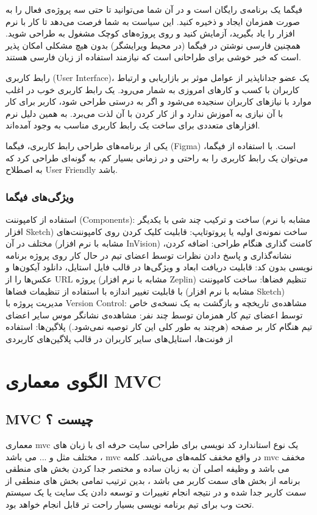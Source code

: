 فیگما یک برنامه‌ی رایگان است و در آن شما می‌توانید تا حتی سه پروژه‌ی فعال را به صورت همزمان ایجاد و ذخیره کنید. این سیاست به شما فرصت می‌دهد تا کار با نرم افزار را یاد بگیرید، آزمایش کنید و روی پروژه‌های کوچک مشغول به طراحی شوید. همچنین فارسی نوشتن در فیگما (در محیط ویرایشگر) بدون هیچ مشکلی امکان پذیر است که خبر خوشی برای طراحانی است که نیازمند استفاده از زبان فارسی هستند.

رابط کاربری (User Interface)، یک عضو جداناپذیر از عوامل موثر بر بازاریابی و ارتباط کاربران با کسب و کارهای امروزی به شمار می‌رود. یک رابط کاربری خوب در اغلب موارد با نیازهای کاربران سنجیده می‌شود و اگر به درستی طراحی شود، کاربر برای کار با آن نیازی به آموزش ندارد و از کار کردن با آن لذت می‌برد. به همین دلیل نرم افزارهای متعددی برای ساخت یک رابط کاربری مناسب به وجود آمده‌اند.

یکی از برنامه‌های طراحی رابط کاربری، فیگما (Figma) است. با استفاده از فیگما، می‌توان یک رابط کاربری را به راحتی و در زمانی بسیار کم، به گونه‌ای طراحی کرد که به اصطلاح User Friendly باشد.
\subsubsection{ویژگی‌های فیگما}
استفاده از کامپوننت (Components): ساخت و ترکیب چند شی با یکدیگر (مشابه با نرم افزار Sketch)
ساخت نمونه‌ی اولیه یا پروتوتایپ: قابلیت کلیک کردن روی کامپوننت‌های مختلف در آن (مشابه با نرم افزار InVision)
کامنت گذاری هنگام طراحی: اضافه کردن، نشانه‌گذاری و پاسخ دادن نظرات توسط اعضای تیم در حال کار روی پروژه
برنامه نویسی بدون کد: قابلیت دریافت ابعاد و ویژگی‌ها در قالب فایل استایل‌، دانلود آیکون‌ها و عکس‌ها را از URL پروژه (مشابه با نرم افزار Zeplin)
تنظیم فضا‌ها: ساخت کامپوننت‌ با قابلیت تغییر اندازه با استفاده از تنظیمات فضاها (مشابه با نرم افزار Sketch)
مدیریت پروژه با Version Control: مشاهده‌ی تاریخچه و بازگشت به یک نسخه‌ی خاص توسط اعضای تیم
کار همزمان توسط چند نفر: مشاهده‌ی نشانگر موس سایر اعضای تیم هنگام کار بر صفحه (هرچند به طور کلی این کار توصیه نمی‌شود.)
پلاگین‌ها: استفاده از فونت‌ها، استایل‌های سایر کاربران در قالب پلاگین‌های کاربردی



\section{الگوی معماری MVC}
\subsection{MVC‌ چیست ؟}
معماری mvc یک نوع استاندارد کد نویسی برای طراحی سایت حرفه ای با زبان های مختلف مثل
 و ... می باشد ، mvc در واقع مخفف کلمه‌های
  می‌باشد.
کلمه mvc مخفف
 می باشد و وظیفه اصلی آن به زبان ساده و مختصر جدا کردن بخش های منطقی برنامه از بخش های سمت کاربر می باشد ، بدین ترتیب تمامی بخش های منطقی از سمت کاربر جدا شده و در نتیجه انجام تغییرات و توسعه دادن یک سایت یا یک سیستم تحت وب برای تیم برنامه نویسی بسیار راحت تر قابل انجام خواهد بود.

